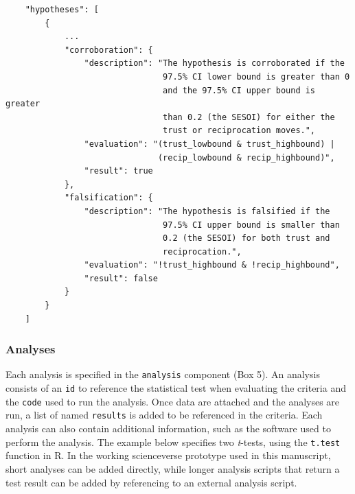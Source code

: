\documentclass[
  english,
  doc,floatsintext]{apa6}
\begin{document}
\begin{tcolorbox}[colback=black!5!white,colframe=white!5!black,title=Box 4. Corroboration and falsification rules.]
\begin{verbatim}
    "hypotheses": [
        {
            ...
            "corroboration": {
                "description": "The hypothesis is corroborated if the
                                97.5% CI lower bound is greater than 0
                                and the 97.5% CI upper bound is greater
                                than 0.2 (the SESOI) for either the
                                trust or reciprocation moves.",
                "evaluation": "(trust_lowbound & trust_highbound) |
                               (recip_lowbound & recip_highbound)",
                "result": true
            },
            "falsification": {
                "description": "The hypothesis is falsified if the
                                97.5% CI upper bound is smaller than
                                0.2 (the SESOI) for both trust and
                                reciprocation.",
                "evaluation": "!trust_highbound & !recip_highbound",
                "result": false
            }
        }
    ]
\end{verbatim}
\end{tcolorbox}

\hypertarget{analyses}{%
\subsubsection{Analyses}\label{analyses}}

Each analysis is specified in the \texttt{analysis} component (Box 5). An analysis consists of an \texttt{id} to reference the statistical test when evaluating the criteria and the \texttt{code} used to run the analysis. Once data are attached and the analyses are run, a list of named \texttt{results} is added to be referenced in the criteria. Each analysis can also contain additional information, such as the software used to perform the analysis. The example below specifies two \emph{t}-tests, using the \texttt{t.test} function in R. In the working scienceverse prototype used in this manuscript, short analyses can be added directly, while longer analysis scripts that return a test result can be added by referencing to an external analysis script.
\end{document}
